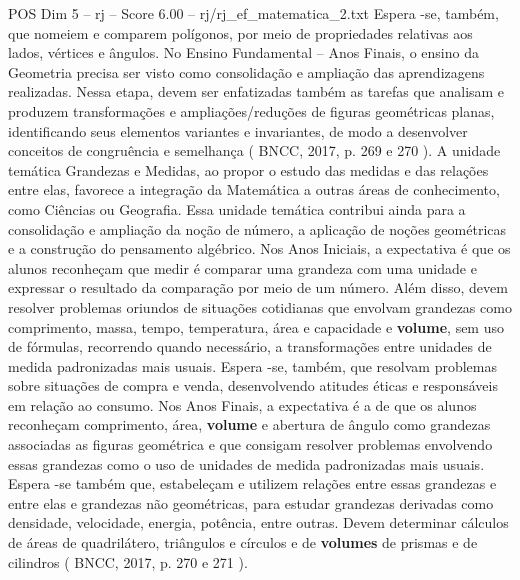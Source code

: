 \begin{textsample}{POS Dim 5 – rj – Score 6.00 – rj/rj\_ef\_matematica\_2.txt}
Espera -se, também, que nomeiem e comparem polígonos, por meio de propriedades relativas aos lados, vértices e ângulos.
No Ensino Fundamental – Anos Finais, o ensino da Geometria precisa ser visto como consolidação e ampliação das aprendizagens realizadas.
Nessa etapa, devem ser enfatizadas também as tarefas que analisam e produzem transformações e ampliações/reduções de figuras geométricas planas, identificando seus elementos variantes e invariantes, de modo a desenvolver conceitos de congruência e semelhança ( BNCC, 2017, p. 269 e 270 ).
A unidade temática Grandezas e Medidas, ao propor o estudo das medidas e das relações entre elas, favorece a integração da Matemática a outras áreas de conhecimento, como Ciências ou Geografia.
Essa unidade temática contribui ainda para a consolidação e ampliação da noção de número, a aplicação de noções geométricas e a construção do pensamento algébrico.
Nos Anos Iniciais, a expectativa é que os alunos reconheçam que medir é comparar uma grandeza com uma unidade e expressar o resultado da comparação por meio de um número.
Além disso, devem resolver problemas oriundos de situações cotidianas que envolvam grandezas como comprimento, massa, tempo, temperatura, área e capacidade e \textbf{volume}, sem uso de fórmulas, recorrendo quando necessário, a transformações entre unidades de medida padronizadas mais usuais.
Espera -se, também, que resolvam problemas sobre situações de compra e venda, desenvolvendo atitudes éticas e responsáveis em relação ao consumo.
Nos Anos Finais, a expectativa é a de que os alunos reconheçam comprimento, área, \textbf{volume} e abertura de ângulo como grandezas associadas as figuras geométrica e que consigam resolver problemas envolvendo essas grandezas como o uso de unidades de medida padronizadas mais usuais.
Espera -se também que, estabeleçam e utilizem relações entre essas grandezas e entre elas e grandezas não geométricas, para estudar grandezas derivadas como densidade, velocidade, energia, potência, entre outras.
Devem determinar cálculos de áreas de quadrilátero, triângulos e círculos e de \textbf{volumes} de prismas e de cilindros ( BNCC, 2017, p. 270 e 271 ).

\end{textsample}
